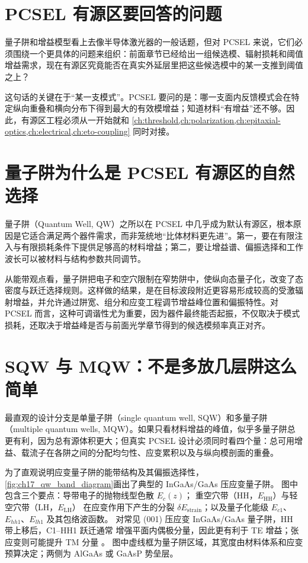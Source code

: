 \section{PCSEL 有源区要回答的问题}
量子阱和增益模型看上去像半导体激光器的一般话题，但对 PCSEL 来说，它们必须围绕一个更具体的问题来组织：前面章节已经给出一组候选模、辐射损耗和阈值增益需求，现在有源区究竟能否在真实外延层里把这些候选模中的某一支推到阈值之上？

这句话的关键在于“某一支模式”。PCSEL 要问的是：哪一支面内反馈模式会在特定纵向重叠和横向分布下得到最大的有效模增益；知道材料“有增益”还不够。因此，有源区工程必须从一开始就和 \cref{ch:threshold,ch:polarization,ch:epitaxial-optics,ch:electrical,ch:eto-coupling} 同时对接。

\section{量子阱为什么是 PCSEL 有源区的自然选择}
量子阱（Quantum Well, QW）之所以在 PCSEL 中几乎成为默认有源区，根本原因是它适合满足两个器件需求，而非笼统地“比体材料更先进”。第一，要在有限注入与有限损耗条件下提供足够高的材料增益；第二，要让增益谱、偏振选择和工作波长可以被材料与结构参数共同调节。

从能带观点看，量子阱把电子和空穴限制在窄势阱中，使纵向态量子化，改变了态密度与跃迁选择规则。这样做的结果，是在目标波段附近更容易形成较高的受激辐射增益，并允许通过阱宽、组分和应变工程调节增益峰位置和偏振特性。对 PCSEL 而言，这种可调谐性尤为重要，因为器件最终能否起振，不仅取决于模式损耗，还取决于增益峰是否与前面光学章节得到的候选模频率真正对齐。

\section{SQW 与 MQW：不是多放几层阱这么简单}
最直观的设计分支是单量子阱（single quantum well, SQW）和多量子阱（multiple quantum wells, MQW）。如果只看材料增益的峰值，似乎多量子阱总更有利，因为总有源体积更大；但真实 PCSEL 设计必须同时看四个量：总可用增益、载流子在各阱之间的分配均匀性、应变累积以及与纵向模剖面的重叠。

为了直观说明应变量子阱的能带结构及其偏振选择性，
\cref{fig:ch17_qw_band_diagram}画出了典型的 InGaAs/\allowbreak GaAs 压应变量子阱。
图中包含三个要点：导带电子的抛物线型色散 $E_c(z)$；
重空穴带（HH，$E_{\mathrm{HH}}$）与轻空穴带（LH，$E_{\mathrm{LH}}$）
在应变作用下产生的分裂 $\delta E_{\mathrm{strain}}$；以及量子化能级
$E_{c1}$、$E_{hh1}$、$E_{lh1}$ 及其包络波函数。
对常见 (001) 压应变 InGaAs/GaAs 量子阱，HH 带上移后，C1--HH1 跃迁通常
增强平面内偶极分量，因此更有利于 TE 增益；张应变则可能提升 TM 分量
\cite{coldren2012,ahn1995strained,nicholes2008strainedmqw}。
图中虚线框为量子阱区域，其宽度由材料体系和应变预算决定；两侧为 AlGaAs 或 GaAsP 势垒层。

